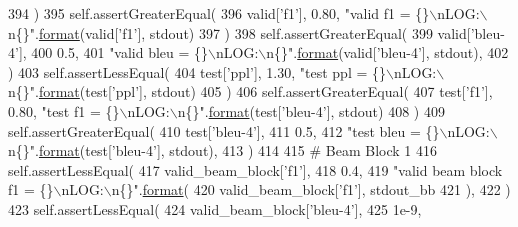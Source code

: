 \begin{DoxyCode}
394         )
395         self.assertGreaterEqual(
396             valid[\textcolor{stringliteral}{'f1'}], 0.80, \textcolor{stringliteral}{"valid f1 = \{\}\(\backslash\)nLOG:\(\backslash\)n\{\}"}.\hyperlink{namespaceparlai_1_1chat__service_1_1services_1_1messenger_1_1shared__utils_a32e2e2022b824fbaf80c747160b52a76}{format}(valid[\textcolor{stringliteral}{'f1'}], stdout)
397         )
398         self.assertGreaterEqual(
399             valid[\textcolor{stringliteral}{'bleu-4'}],
400             0.5,
401             \textcolor{stringliteral}{"valid bleu = \{\}\(\backslash\)nLOG:\(\backslash\)n\{\}"}.\hyperlink{namespaceparlai_1_1chat__service_1_1services_1_1messenger_1_1shared__utils_a32e2e2022b824fbaf80c747160b52a76}{format}(valid[\textcolor{stringliteral}{'bleu-4'}], stdout),
402         )
403         self.assertLessEqual(
404             test[\textcolor{stringliteral}{'ppl'}], 1.30, \textcolor{stringliteral}{"test ppl = \{\}\(\backslash\)nLOG:\(\backslash\)n\{\}"}.\hyperlink{namespaceparlai_1_1chat__service_1_1services_1_1messenger_1_1shared__utils_a32e2e2022b824fbaf80c747160b52a76}{format}(test[\textcolor{stringliteral}{'ppl'}], stdout)
405         )
406         self.assertGreaterEqual(
407             test[\textcolor{stringliteral}{'f1'}], 0.80, \textcolor{stringliteral}{"test f1 = \{\}\(\backslash\)nLOG:\(\backslash\)n\{\}"}.\hyperlink{namespaceparlai_1_1chat__service_1_1services_1_1messenger_1_1shared__utils_a32e2e2022b824fbaf80c747160b52a76}{format}(test[\textcolor{stringliteral}{'bleu-4'}], stdout)
408         )
409         self.assertGreaterEqual(
410             test[\textcolor{stringliteral}{'bleu-4'}],
411             0.5,
412             \textcolor{stringliteral}{"test bleu = \{\}\(\backslash\)nLOG:\(\backslash\)n\{\}"}.\hyperlink{namespaceparlai_1_1chat__service_1_1services_1_1messenger_1_1shared__utils_a32e2e2022b824fbaf80c747160b52a76}{format}(test[\textcolor{stringliteral}{'bleu-4'}], stdout),
413         )
414 
415         \textcolor{comment}{# Beam Block 1}
416         self.assertLessEqual(
417             valid\_beam\_block[\textcolor{stringliteral}{'f1'}],
418             0.4,
419             \textcolor{stringliteral}{"valid beam block f1 = \{\}\(\backslash\)nLOG:\(\backslash\)n\{\}"}.\hyperlink{namespaceparlai_1_1chat__service_1_1services_1_1messenger_1_1shared__utils_a32e2e2022b824fbaf80c747160b52a76}{format}(
420                 valid\_beam\_block[\textcolor{stringliteral}{'f1'}], stdout\_bb
421             ),
422         )
423         self.assertLessEqual(
424             valid\_beam\_block[\textcolor{stringliteral}{'bleu-4'}],
425             1e-9,

\end{DoxyCode}
